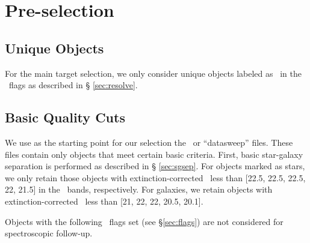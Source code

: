 \documentclass[12pt,preprint]{aastex}
\begin{document}
\section{Pre-selection}

\subsection{Unique Objects}

For the main target selection, we only consider unique objects labeled as
\surveyprimary\ in the \resolveflags\ flags as described in \S
\ref{sec:resolve}.

\subsection{Basic Quality Cuts} \label{sec:basiccuts}

We use as the starting point for our selection the \calibObj\ or ``datasweep''
files.   These files contain only objects that meet certain basic criteria.
First, basic star-galaxy separation is performed as described in \S
\ref{sec:sgsep}.  For objects marked as stars, we only retain those objects
with extinction-corrected \psfmag\ less than [22.5, 22.5, 22.5, 22, 21.5] in
the \allmag\ bands, respectively.  For galaxies, we retain objects with
extinction-corrected \modelmag\ less than [21, 22, 22, 20.5, 20.1].

Objects with the following \objflags\ flags set (see \S \ref{sec:flags}) are
not considered for spectroscopic follow-up.  
\end{document}

